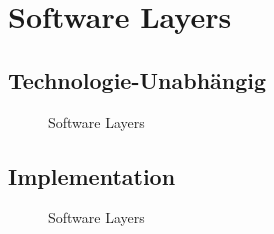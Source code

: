 \section{Software Layers}

\subsection*{Technologie-Unabhängig}

\begin{figure}[ht!]
	\centering{
		
	}

	\caption{Software Layers}
\end{figure}

\newpage
\subsection*{Implementation}

\begin{figure}[ht!]
	\centering{
		
	}

	\caption{Software Layers}
\end{figure}